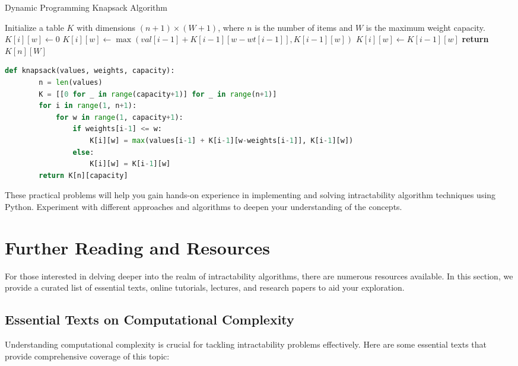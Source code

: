 \documentclass[12pt]{book} %
\begin{document}
\begin{enumerate}
    \begin{algorithm}[H]
        \caption{Dynamic Programming Knapsack Algorithm}
        \begin{algorithmic}[1]
            \State Initialize a table $K$ with dimensions $(n+1) \times (W+1)$, where $n$ is the number of items and $W$ is the maximum weight capacity.
                        \State $K[i][w] \gets 0$
                        \State $K[i][w] \gets \max(val[i-1] + K[i-1][w-wt[i-1]], K[i-1][w])$
                    \Else
                        \State $K[i][w] \gets K[i-1][w]$
                    \EndIf
                \EndFor
            \EndFor
            \State \textbf{return} $K[n][W]$
        \end{algorithmic}
    \end{algorithm}
    
    \FloatBarrier
    
    \begin{lstlisting}[language=Python]
    def knapsack(values, weights, capacity):
        n = len(values)
        K = [[0 for _ in range(capacity+1)] for _ in range(n+1)]
        for i in range(1, n+1):
            for w in range(1, capacity+1):
                if weights[i-1] <= w:
                    K[i][w] = max(values[i-1] + K[i-1][w-weights[i-1]], K[i-1][w])
                else:
                    K[i][w] = K[i-1][w]
        return K[n][capacity]
    \end{lstlisting}
    
\end{enumerate}

These practical problems will help you gain hands-on experience in implementing and solving intractability algorithm techniques using Python. Experiment with different approaches and algorithms to deepen your understanding of the concepts.

\section{Further Reading and Resources}
For those interested in delving deeper into the realm of intractability algorithms, there are numerous resources available. In this section, we provide a curated list of essential texts, online tutorials, lectures, and research papers to aid your exploration.

\subsection{Essential Texts on Computational Complexity}
Understanding computational complexity is crucial for tackling intractability problems effectively. Here are some essential texts that provide comprehensive coverage of this topic:
\end{document}
